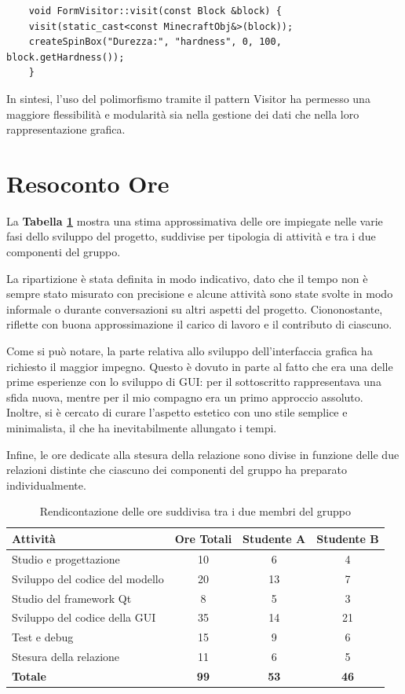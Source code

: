 \documentclass[12pt]{article}
\begin{document}
\begin{lstlisting}
    void FormVisitor::visit(const Block &block) {
    visit(static_cast<const MinecraftObj&>(block));
    createSpinBox("Durezza:", "hardness", 0, 100, block.getHardness());
    }
\end{lstlisting}

In sintesi, l’uso del polimorfismo tramite il pattern Visitor ha permesso una maggiore flessibilità e modularità sia nella gestione dei dati che nella loro rappresentazione grafica.

\section{Resoconto Ore}
La \textbf{Tabella \ref{tab:rendicontazione}} mostra una stima approssimativa delle ore impiegate nelle varie fasi dello sviluppo del progetto, suddivise per tipologia di attività e tra i due componenti del gruppo.

La ripartizione è stata definita in modo indicativo, dato che il tempo non è sempre stato misurato con precisione e alcune attività sono state svolte in modo informale o durante conversazioni su altri aspetti del progetto. Ciononostante, riflette con buona approssimazione il carico di lavoro e il contributo di ciascuno.

Come si può notare, la parte relativa allo sviluppo dell’interfaccia grafica ha richiesto il maggior impegno. Questo è dovuto in parte al fatto che era una delle prime esperienze con lo sviluppo di GUI: per il sottoscritto rappresentava una sfida nuova, mentre per il mio compagno era un primo approccio assoluto. Inoltre, si è cercato di curare l’aspetto estetico con uno stile semplice e minimalista, il che ha inevitabilmente allungato i tempi.

Infine, le ore dedicate alla stesura della relazione sono divise in funzione delle due relazioni distinte che ciascuno dei componenti del gruppo ha preparato individualmente.

\begin{table}[H]
\centering
\begin{tabular}{|l|c|c|c|}
\hline
\textbf{Attività} & \textbf{Ore Totali} & \textbf{Studente A} & \textbf{Studente B} \\
\hline
Studio e progettazione            & 10 & 6 & 4 \\
Sviluppo del codice del modello   & 20 & 13 & 7 \\
Studio del framework Qt           & 8  & 5 & 3 \\
Sviluppo del codice della GUI     & 35 & 14 & 21 \\
Test e debug                      & 15 & 9 & 6 \\
Stesura della relazione           & 11 & 6 & 5 \\
\hline
\textbf{Totale}                   & \textbf{99} & \textbf{53} & \textbf{46} \\
\hline
\end{tabular}
\caption{Rendicontazione delle ore suddivisa tra i due membri del gruppo}
\label{tab:rendicontazione}
\end{table}
\end{document}
